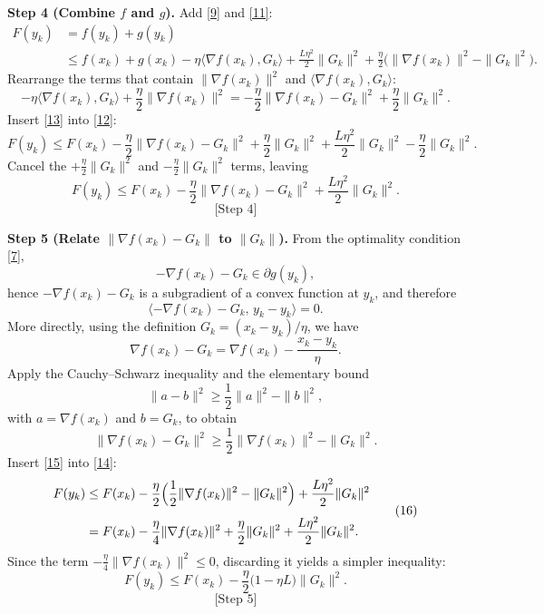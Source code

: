 \documentclass{article}
\newcommand{\grad}{\nabla}
\begin{document}
\noindent\textbf{Step 4 (Combine $f$ and $g$).}  
Add \eqref{9} and \eqref{11}:
\[
\begin{aligned}
F(y_{k}) &= f(y_{k})+g(y_{k})\\
&\le f(x_{k})+g(x_{k})
   -\eta\langle\grad f(x_{k}),G_{k}\rangle
   +\frac{L\eta^{2}}{2}\|G_{k}\|^{2}
   +\frac{\eta}{2}\bigl(\|\grad f(x_{k})\|^{2}-\|G_{k}\|^{2}\bigr) .
\end{aligned}
\tag{12}
\] 
Rearrange the terms that contain $\|\grad f(x_{k})\|^{2}$ and $\langle\grad f(x_{k}),G_{k}\rangle$:
\[
-\eta\langle\grad f(x_{k}),G_{k}\rangle+\frac{\eta}{2}\|\grad f(x_{k})\|^{2}
= -\frac{\eta}{2}\bigl\|\grad f(x_{k})-G_{k}\bigr\|^{2}
+\frac{\eta}{2}\|G_{k}\|^{2}.
\tag{13}
\] 
Insert \eqref{13} into \eqref{12}:
\[
F(y_{k})\le F(x_{k})
 -\frac{\eta}{2}\bigl\|\grad f(x_{k})-G_{k}\bigr\|^{2}
 +\frac{\eta}{2}\|G_{k}\|^{2}
 +\frac{L\eta^{2}}{2}\|G_{k}\|^{2}
 -\frac{\eta}{2}\|G_{k}\|^{2}.
\] 
Cancel the $+\frac{\eta}{2}\|G_{k}\|^{2}$ and $-\frac{\eta}{2}\|G_{k}\|^{2}$ terms, leaving
\[
F(y_{k})\le F(x_{k})-\frac{\eta}{2}\bigl\|\grad f(x_{k})-G_{k}\bigr\|^{2}
+\frac{L\eta^{2}}{2}\|G_{k}\|^{2}.
\tag{14}
\] 
\[
\text{[Step 4]}
\]

\noindent\textbf{Step 5 (Relate $\|\grad f(x_{k})-G_{k}\|$ to $\|G_{k}\|$).}  
From the optimality condition \eqref{7},
\[
-\grad f(x_{k})-G_{k}\in\partial g(y_{k}),
\]
hence $-\grad f(x_{k})-G_{k}$ is a subgradient of a convex function at $y_{k}$, and therefore
\[
\langle -\grad f(x_{k})-G_{k},\, y_{k}-y_{k}\rangle =0 .
\] 
More directly, using the definition $G_{k}= (x_{k}-y_{k})/\eta$, we have
\[
\grad f(x_{k})-G_{k}= \grad f(x_{k})-\frac{x_{k}-y_{k}}{\eta}.
\] 
Apply the Cauchy–Schwarz inequality and the elementary bound
\[
\|a-b\|^{2}\ge\frac{1}{2}\|a\|^{2}-\|b\|^{2},
\]
with $a=\grad f(x_{k})$ and $b=G_{k}$, to obtain
\[
\bigl\|\grad f(x_{k})-G_{k}\bigr\|^{2}
\ge \frac{1}{2}\|\grad f(x_{k})\|^{2}-\|G_{k}\|^{2}.
\tag{15}
\] 
Insert \eqref{15} into \eqref{14}:
\[
\begin{aligned}
F(y_{k})
&\le F(x_{k})
 -\frac{\eta}{2}\Bigl(\frac12\|\grad f(x_{k})\|^{2}-\|G_{k}\|^{2}\Bigr)
 +\frac{L\eta^{2}}{2}\|G_{k}\|^{2}\\[4pt]
&= F(x_{k})
 -\frac{\eta}{4}\|\grad f(x_{k})\|^{2}
 +\frac{\eta}{2}\|G_{k}\|^{2}
 +\frac{L\eta^{2}}{2}\|G_{k}\|^{2}.
\end{aligned}
\tag{16}
\] 
Since the term $-\frac{\eta}{4}\|\grad f(x_{k})\|^{2}\le0$, discarding it yields a simpler inequality:
\[
F(y_{k})\le F(x_{k})-\frac{\eta}{2}\bigl(1-\eta L\bigr)\|G_{k}\|^{2}.
\tag{17}
\] 
\[
\text{[Step 5]}
\]
\end{document}
